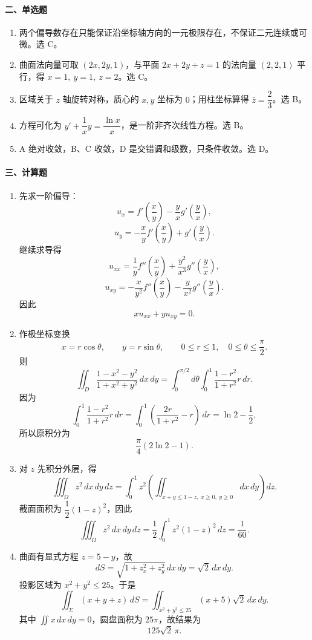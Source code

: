 \paragraph*{二、单选题}
\begin{enumerate}
  \item 两个偏导数存在只能保证沿坐标轴方向的一元极限存在，不保证二元连续或可微。选 C。
  \item 曲面法向量可取 $(2x,2y,1)$，与平面 $2x+2y+z=1$ 的法向量 $(2,2,1)$ 平行，得 $x=1,\ y=1,\ z=2$。选 C。
  \item 区域关于 $z$ 轴旋转对称，质心的 $x,y$ 坐标为 $0$；用柱坐标算得 $\bar z=\dfrac23$。选 B。
  \item 方程可化为 \(y'+\dfrac1x y=\dfrac{\ln x}{x}\)，是一阶非齐次线性方程。选 B。
  \item A 绝对收敛，B、C 收敛，D 是交错调和级数，只条件收敛。选 D。
\end{enumerate}

\paragraph*{三、计算题}
\begin{enumerate}
  \item 先求一阶偏导：
  \[
    u_x=f'\left(\frac{x}{y}\right)-\frac{y}{x}g'\left(\frac{y}{x}\right),
  \]
  \[
    u_y=-\frac{x}{y}f'\left(\frac{x}{y}\right)+g'\left(\frac{y}{x}\right).
  \]
  继续求导得
  \[
    u_{xx}=\frac1y f''\left(\frac{x}{y}\right)
    +\frac{y^2}{x^3}g''\left(\frac{y}{x}\right),
  \]
  \[
    u_{xy}=-\frac{x}{y^2}f''\left(\frac{x}{y}\right)
    -\frac{y}{x^2}g''\left(\frac{y}{x}\right).
  \]
  因此
  \[
    x u_{xx}+y u_{xy}=0.
  \]

  \item 作极坐标变换
  \[
    x=r\cos\theta,\qquad y=r\sin\theta,\qquad 0\le r\le1,\quad 0\le\theta\le\frac{\pi}{2}.
  \]
  则
  \[
    \iint_D \frac{1-x^2-y^2}{1+x^2+y^2}\,dx\,dy
    =
    \int_0^{\pi/2}d\theta\int_0^1\frac{1-r^2}{1+r^2}r\,dr.
  \]
  因为
  \[
    \int_0^1\frac{1-r^2}{1+r^2}r\,dr
    =\int_0^1\left(\frac{2r}{1+r^2}-r\right)\,dr
    =\ln2-\frac12,
  \]
  所以原积分为
  \[
    \frac{\pi}{4}(2\ln2-1).
  \]

  \item 对 $z$ 先积分外层，得
  \[
    \iiint_\Omega z^2\,dx\,dy\,dz
    =
    \int_0^1 z^2
    \left(\iint_{x+y\le1-z,\ x\ge0,\ y\ge0}dx\,dy\right)dz.
  \]
  截面面积为 $\dfrac12(1-z)^2$，因此
  \[
    \iiint_\Omega z^2\,dx\,dy\,dz
    =
    \frac12\int_0^1 z^2(1-z)^2\,dz
    =
    \frac1{60}.
  \]

  \item 曲面有显式方程 $z=5-y$，故
  \[
    dS=\sqrt{1+z_x^2+z_y^2}\,dx\,dy=\sqrt2\,dx\,dy.
  \]
  投影区域为 $x^2+y^2\le25$。于是
  \[
    \iint_\Sigma (x+y+z)\,dS
    =
    \iint_{x^2+y^2\le25}(x+5)\sqrt2\,dx\,dy.
  \]
  其中 $\iint x\,dx\,dy=0$，圆盘面积为 $25\pi$，故结果为
  \[
    125\sqrt2\,\pi.
  \]
\end{enumerate}

